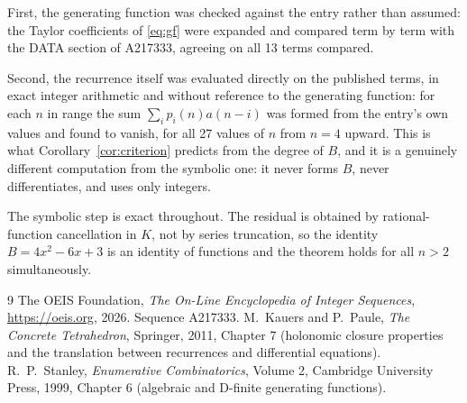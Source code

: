 \documentclass[11pt,a4paper]{article}
\theoremstyle{plain}
\theoremstyle{definition}
\begin{document}
First, the generating function was checked against the entry rather than assumed: the
Taylor coefficients of \eqref{eq:gf} were expanded and compared term by term with the DATA
section of A217333, agreeing on all 13 terms compared.

Second, the recurrence itself was evaluated directly on the published terms, in exact
integer arithmetic and without reference to the generating function: for each $n$ in range
the sum $\sum_{i}p_{i}(n)a(n-i)$ was formed from the entry's own values and found to
vanish, for all 27 values of $n$ from $n=4$ upward. This is what
Corollary~\ref{cor:criterion} predicts from the degree of $B$, and it is a genuinely
different computation from the symbolic one: it never forms $B$, never differentiates, and
uses only integers.

The symbolic step is exact throughout. The residual is obtained by rational-function
cancellation in $K$, not by series truncation, so the identity $B=4 x^{2} - 6 x + 3$ is an
identity of functions and the theorem holds for all $n>2$ simultaneously.

\begin{thebibliography}{9}
 The OEIS Foundation, \emph{The On-Line Encyclopedia of Integer Sequences},
\url{https://oeis.org}, 2026. Sequence A217333.
 M.~Kauers and P.~Paule, \emph{The Concrete Tetrahedron}, Springer, 2011,
Chapter 7 (holonomic closure properties and the translation between recurrences and
differential equations).
 R.~P.~Stanley, \emph{Enumerative Combinatorics}, Volume 2, Cambridge
University Press, 1999, Chapter 6 (algebraic and D-finite generating functions).
\end{thebibliography}
\end{document}
